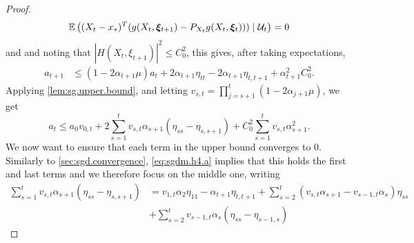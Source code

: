 \begin{proof}
\[
\bm{\mathbb E}\left((X_t - x_*)^T ( g(X_t, {\bm{\xi}}_{t+1}) - P_{X_t} g(X_t, {\bm{\xi}}_{t}))) \mid {\mathcal U}_t\right) = 0
\]
and 
%
and noting that $|H(X_t, \xi_{t+1})|^2\leq C_0^2$, this gives, after taking expectations,
 \begin{align*}
a_{t+1} & \leq (1-2\alpha_{t+1}\mu)a_t + 2\alpha_{t+1} \eta_{tt}  - 2\alpha_{t+1} \eta_{t,t+1}
 +  \alpha_{t+1}^2 C_0^2.
\end{align*}
Applying \cref{lem:sg.upper.bound}, and letting $v_{s,t} = \prod_{j=s+1}^t (1-2\alpha_{j+1}\mu)$, we get 
\[
a_t \leq a_0 v_{0,t} + 2 \sum_{s=1}^t v_{s,t} \alpha_{s+1} (\eta_{ss}  - \eta_{s,s+1}) + C_0^2\sum_{s=1}^t v_{s,t} \alpha_{s+1}^2.
\]
We now want to ensure that each term in the upper bound converges to 0. Similarly to \cref{sec:sgd.convergence}, \cref{eq:sgdm.h4.a} implies that this holds the first and last terms and we therefore focus on the middle one, writing
\begin{align}
\label{eq:sgd.markov.main.2}
\sum_{s=1}^t v_{s,t} \alpha_{s+1} (\eta_{ss}  - \eta_{s,s+1})
&= v_{1, t} \alpha_2 \eta_{11} - \alpha_{t+1} \eta_{t,t+1} + \sum_{s=2}^t
(v_{s,t} \alpha_{s+1} - v_{s-1,t} \alpha_{s}) \eta_{ss}  \\
\nonumber
&+ \sum_{s=2}^t v_{s-1,t} \alpha_{s} (\eta_{ss} - \eta_{s-1,s}) 
\end{align}


\end{proof}
